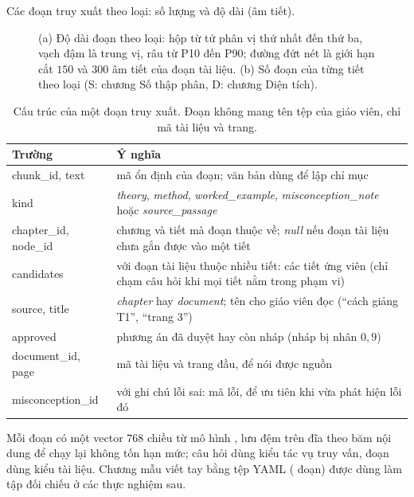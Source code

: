 \begin{table}[tp]
\centering
\caption{Các đoạn truy xuất theo loại: số lượng và độ dài (âm tiết).}
\label{tab:chunks}

\end{table}

\begin{figure}[tp]
\centering

\caption{(a) Độ dài đoạn theo loại: hộp từ tứ phân vị thứ nhất đến thứ ba, vạch đậm là trung vị, râu từ P10 đến P90; đường đứt nét là giới hạn cắt $150$ và $300$ âm tiết của đoạn tài liệu. (b) Số đoạn của từng tiết theo loại (S: chương Số thập phân, D: chương Diện tích).}
\label{fig:chunks}
\end{figure}

\begin{table}[tbp]
\centering
\caption{Cấu trúc của một đoạn truy xuất. Đoạn không mang tên tệp của giáo viên, chỉ mã tài liệu và trang.}
\label{tab:chunk-fields}
\small
\begin{tabularx}{\linewidth}{@{}>{\ttfamily\small}p{3.2cm}Y@{}}
\toprule
Trường & Ý nghĩa \\
\midrule
chunk\_id, text & mã ổn định của đoạn; văn bản dùng để lập chỉ mục \\
kind & \emph{theory}, \emph{method}, \emph{worked\_example}, \emph{misconception\_note} hoặc \emph{source\_passage} \\
chapter\_id, node\_id & chương và tiết mà đoạn thuộc về; \emph{null} nếu đoạn tài liệu chưa gắn được vào một tiết \\
candidates & với đoạn tài liệu thuộc nhiều tiết: các tiết ứng viên (chỉ chạm câu hỏi khi mọi tiết nằm trong phạm vi) \\
source, title & \emph{chapter} hay \emph{document}; tên cho giáo viên đọc (``cách giảng T1'', ``trang 3'') \\
approved & phương án đã duyệt hay còn nháp (nháp bị nhân $0{,}9$) \\
document\_id, page & mã tài liệu và trang đầu, để nói được nguồn \\
misconception\_id & với ghi chú lỗi sai: mã lỗi, để ưu tiên khi vừa phát hiện lỗi đó \\
\bottomrule
\end{tabularx}
\end{table}

Mỗi đoạn có một vector $768$ chiều từ mô hình , lưu đệm trên đĩa theo băm nội dung để chạy lại không tốn hạn mức; câu hỏi dùng kiểu tác vụ truy vấn, đoạn dùng kiểu tài liệu. Chương mẫu viết tay bằng tệp YAML (\NChunksSample{} đoạn) được dùng làm tập đối chiếu ở các thực nghiệm sau.
